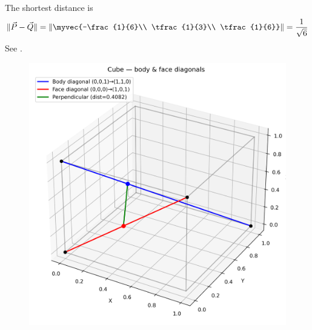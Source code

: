The shortest distance is
\begin{align}
  \|\vec{P}-\vec{Q}\|
  = \left\|\myvec{-\frac{1}{6}\\ \tfrac{1}{3}\\ \tfrac{1}{6}}\right\| = \frac{1}{\sqrt{6}}
\end{align}
  See .
\begin{figure}[H]
  \centering
  \includegraphics[width=0.7\columnwidth]{JEE/chapters/2.10.84/figs/cube_lines.png} 
   \caption{}
  \label{fig:2.10.84/Fig1}
\end{figure}

